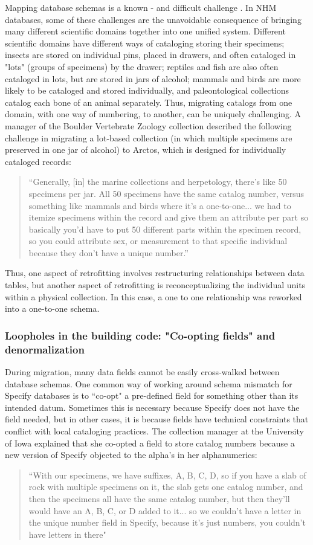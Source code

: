 Mapping database schemas is a known - and difficult challenge \cite{Batini_1986}. In NHM databases, some of these challenges are the unavoidable consequence of bringing many different scientific domains together into one unified system. Different scientific domains have different ways of cataloging storing their specimens; insects are stored on individual pins, placed in drawers, and often cataloged in "lots" (groups of specimens) by the drawer; reptiles and fish are also often cataloged in lots, but are stored in jars of alcohol; mammals and birds are more likely to be cataloged and stored individually, and paleontological collections catalog each bone of an animal separately. Thus, migrating catalogs from one domain, with one way of numbering, to another, can be uniquely challenging. A manager of the Boulder Vertebrate Zoology collection described the following challenge in migrating a lot-based collection (in which multiple specimens are preserved in one jar of alcohol) to Arctos, which is designed for individually cataloged records:
\begin{quote}
“Generally, [in] the marine collections and herpetology, there's like 50 specimens per jar. All 50 specimens have the same catalog number, versus something like mammals and birds where it's a one-to-one... we had to itemize specimens within the record and give them an attribute per part so basically you'd have to put 50 different parts within the specimen record, so you could attribute sex, or measurement to that specific individual because they don't have a unique number.”
\end{quote}
Thus, one aspect of retrofitting involves restructuring relationships between data tables, but another aspect of retrofitting is reconceptualizing the individual units within a physical collection. In this case, a one to one relationship was reworked into a one-to-one schema.

\subsubsection{Loopholes in the building code: "Co-opting fields" and denormalization }
During migration, many data fields cannot be easily cross-walked between database schemas. One common way of working around schema mismatch for Specify databases is to “co-opt" a pre-defined field for something other than its intended datum. Sometimes this is necessary because Specify does not have the field needed, but in other cases, it is because fields have technical constraints that conflict with local cataloging practices. The collection manager at the University of Iowa explained that she co-opted a field to store catalog numbers because a new version of Specify objected to the alpha’s in her alphanumerics:
\begin{quote}
“With our specimens, we have suffixes, A, B, C, D, so if you have a slab of rock with multiple specimens on it, the slab gets one catalog number, and then the specimens all have the same catalog number, but then they'll would have an A, B, C, or D added to it... so we couldn't have a letter in the unique number field in Specify, because it's just numbers, you couldn't have letters in there"
\end{quote}


